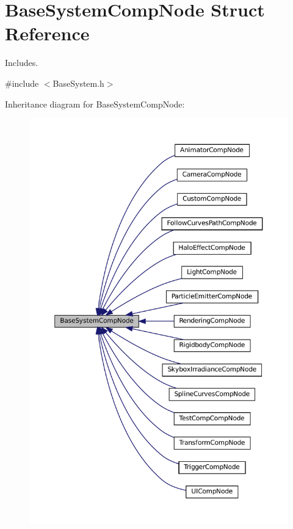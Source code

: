 \hypertarget{structBaseSystemCompNode}{}\section{Base\+System\+Comp\+Node Struct Reference}
\label{structBaseSystemCompNode}


Includes.  




{\ttfamily \#include $<$Base\+System.\+h$>$}



Inheritance diagram for Base\+System\+Comp\+Node\+:
\nopagebreak
\begin{figure}[H]
\begin{center}
\leavevmode
\includegraphics[width=350pt]{structBaseSystemCompNode__inherit__graph}
\end{center}
\end{figure}
